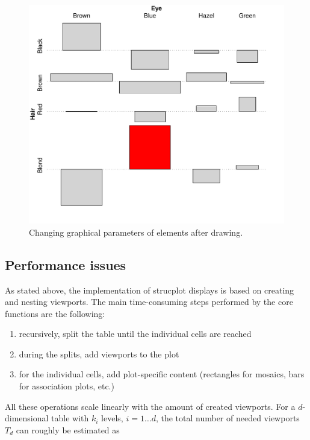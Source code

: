 \documentclass{Z}
\begin{document}
\begin{figure}[h]
\begin{center}
\includegraphics{strucplot-changeplotfig}
\caption{Changing graphical parameters of elements after drawing.}
\label{fig:changeplot}
\end{center}
\end{figure}

\subsection{Performance issues}
\label{sec:performance}

As stated above, the implementation of strucplot displays is based on
creating and nesting  viewports. The main time-consuming steps performed by
the core functions are the following:

\begin{enumerate}
\item recursively, split the table until the individual cells are reached
\item during the splits, add viewports to the plot
\item for the individual cells, add plot-specific content 
      (rectangles for mosaics, bars for association plots, etc.)
\end{enumerate}

\noindent All these operations scale linearly with the amount of
created viewports. For a $d$-dimensional table with $k_i$
levels, $i=1 \dots d$, the total number of needed viewports
$T_d$ can roughly be estimated as
\end{document}
